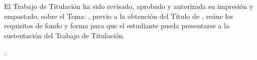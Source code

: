 \clearpage
{}
El Trabajo de Titulación ha sido revisado, aprobado y autorizada su impresión y
empastado, sobre el Tema: \textbf{\Tema}, previo a la obtención del Título de
\TituloAObtener, reúne los requisitos de fondo y forma para que el estudiante
pueda presentarse a la sustentación del Trabajo de Titulación.

\vspace{10mm}
\CiudadTexto, \FechaAprobacion

\vspace{22mm}

\vspace{16mm}
